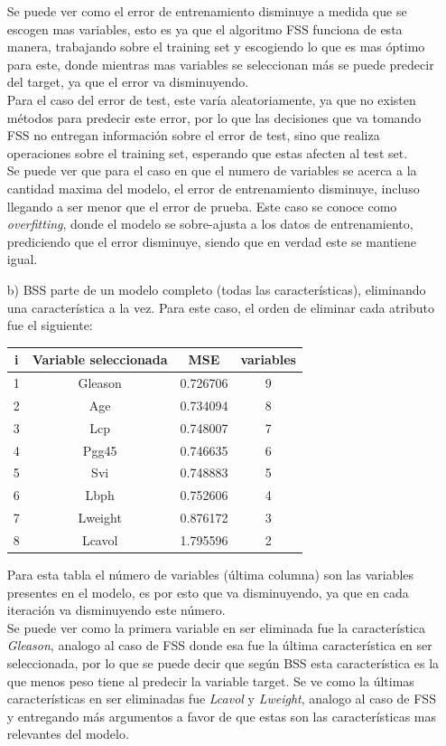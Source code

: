 \documentclass[10pt]{article}
\begin{document}
\begin{itemize}
Se puede ver como el error de entrenamiento disminuye a medida que se escogen mas variables, esto es ya que el algoritmo FSS funciona de esta manera, trabajando sobre el training set y escogiendo lo que es mas óptimo para este, donde mientras mas variables se seleccionan más se puede predecir del target, ya que el error va disminuyendo. \\
Para el caso del error de test, este varía aleatoriamente, ya que no existen métodos para predecir este error, por lo que las decisiones que va tomando FSS no entregan información sobre el error de test, sino que realiza operaciones sobre el training set, esperando que estas afecten al test set.\\
Se puede ver que para el caso en que el numero de variables se acerca a la cantidad maxima del modelo, el error de entrenamiento disminuye, incluso llegando a ser menor que el error de prueba. Este caso se conoce como \textit{overfitting}, donde el modelo se sobre-ajusta a los datos de entrenamiento, prediciendo que el error disminuye, siendo que en verdad este se mantiene igual.

\item[b)] BSS parte de un modelo completo (todas las características), eliminando una característica a la vez. Para este caso, el orden de eliminar cada atributo fue el siguiente:

\begin{table}[!htb]
  \begin{center}
    \begin{tabular}{|c|c|c|c|} \hline
    i & Variable seleccionada & MSE & variables \\ \hline
    1 & Gleason & 0.726706 &9 \\ 
    2 & Age & 0.734094 &8 \\ 
    3 & Lcp & 0.748007 &7 \\ 
    4 & Pgg45 & 0.746635 &6 \\ 
    5 & Svi & 0.748883 &5 \\ 
    6 & Lbph & 0.752606 &4 \\ 
    7 & Lweight & 0.876172 &3 \\
    8 & Lcavol & 1.795596 &2 \\ \hline  
    \end{tabular}
  \end{center}
\end{table}

Para esta tabla el número de variables (última columna) son las variables presentes en el modelo, es por esto que va disminuyendo, ya que en cada iteración va disminuyendo este número.\\
Se puede ver como la primera variable en ser eliminada fue la característica \textit{Gleason}, analogo al caso de FSS donde esa fue la última característica en ser seleccionada, por lo que se puede decir que según BSS esta característica es la que menos peso tiene al predecir la variable target. Se ve como la últimas características en ser eliminadas fue \textit{Lcavol} y \textit{Lweight}, analogo al caso de FSS y entregando más argumentos a favor de que estas son las características mas relevantes del modelo.\\


\end{itemize}
\end{document}
